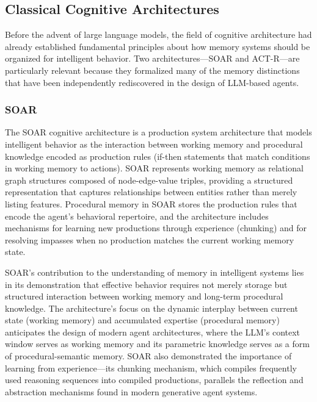 \subsection{Classical Cognitive Architectures}

Before the advent of large language models, the field of cognitive architecture had already established fundamental principles about how memory systems should be organized for intelligent behavior. Two architectures---SOAR and ACT-R---are particularly relevant because they formalized many of the memory distinctions that have been independently rediscovered in the design of LLM-based agents.

\subsubsection{SOAR}

The SOAR cognitive architecture \citep{laird2012soar} is a production system architecture that models intelligent behavior as the interaction between working memory and procedural knowledge encoded as production rules (if-then statements that match conditions in working memory to actions). SOAR represents working memory as relational graph structures composed of node-edge-value triples, providing a structured representation that captures relationships between entities rather than merely listing features. Procedural memory in SOAR stores the production rules that encode the agent's behavioral repertoire, and the architecture includes mechanisms for learning new productions through experience (chunking) and for resolving impasses when no production matches the current working memory state.

SOAR's contribution to the understanding of memory in intelligent systems lies in its demonstration that effective behavior requires not merely storage but structured interaction between working memory and long-term procedural knowledge. The architecture's focus on the dynamic interplay between current state (working memory) and accumulated expertise (procedural memory) anticipates the design of modern agent architectures, where the LLM's context window serves as working memory and its parametric knowledge serves as a form of procedural-semantic memory. SOAR also demonstrated the importance of learning from experience---its chunking mechanism, which compiles frequently used reasoning sequences into compiled productions, parallels the reflection and abstraction mechanisms found in modern generative agent systems.

